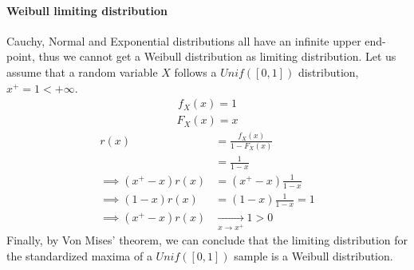 \paragraph{Weibull limiting distribution}
Cauchy, Normal and Exponential distributions all have an infinite upper end-point, thus we cannot get a Weibull distribution as limiting distribution. Let us assume that a random variable $X$ follows a $Unif([0,1])$ distribution, $x^+ = 1 < + \infty$. 
\begin{equation}
\begin{alignat*}{2}
f_X(x) = 1
\end{alignat*}
\end{equation}
\begin{equation}
\begin{alignat*}{2}
F_X(x) =  x
\end{alignat*}
\end{equation}
\begin{equation}
\begin{alignat*}{2}
r(x) &= \frac{f_X(x)}{1 - F_X(x)} \\
&= \frac{1}{1 - x} \\
\implies (x^+ - x) r(x) &= (x^+ - x) \frac{1}{1 - x} \\
\implies (1 - x) r(x) &= (1 - x) \frac{1}{1 - x} = 1 \\
\implies (x^+ - x) r(x) &\xrightarrow[x \rightarrow x^+]{} 1 > 0
\end{alignat*}
\end{equation}
Finally, by Von Mises' theorem, we can conclude that the limiting distribution for the standardized maxima of a $Unif([0,1])$ sample is a Weibull distribution.